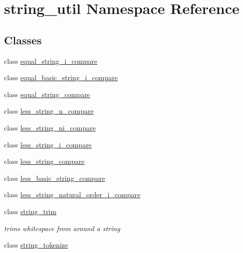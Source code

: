 \hypertarget{namespacestring__util}{\section{string\-\_\-util Namespace Reference}
\label{namespacestring__util}
}
\subsection*{Classes}
\begin{DoxyCompactItemize}
\item 
class \hyperlink{classstring__util_1_1equal__string__i__compare}{equal\-\_\-string\-\_\-i\-\_\-compare}
\item 
class \hyperlink{classstring__util_1_1equal__basic__string__i__compare}{equal\-\_\-basic\-\_\-string\-\_\-i\-\_\-compare}
\item 
class \hyperlink{classstring__util_1_1equal__string__compare}{equal\-\_\-string\-\_\-compare}
\item 
class \hyperlink{classstring__util_1_1less__string__n__compare}{less\-\_\-string\-\_\-n\-\_\-compare}
\item 
class \hyperlink{classstring__util_1_1less__string__ni__compare}{less\-\_\-string\-\_\-ni\-\_\-compare}
\item 
class \hyperlink{classstring__util_1_1less__string__i__compare}{less\-\_\-string\-\_\-i\-\_\-compare}
\item 
class \hyperlink{classstring__util_1_1less__string__compare}{less\-\_\-string\-\_\-compare}
\item 
class \hyperlink{classstring__util_1_1less__basic__string__compare}{less\-\_\-basic\-\_\-string\-\_\-compare}
\item 
class \hyperlink{classstring__util_1_1less__string__natural__order__i__compare}{less\-\_\-string\-\_\-natural\-\_\-order\-\_\-i\-\_\-compare}
\item 
class \hyperlink{classstring__util_1_1string__trim}{string\-\_\-trim}
\begin{DoxyCompactList}\small\item\em trims whitespace from around a string \end{DoxyCompactList}\item 
class \hyperlink{classstring__util_1_1string__tokenize}{string\-\_\-tokenize}
\end{DoxyCompactItemize}
